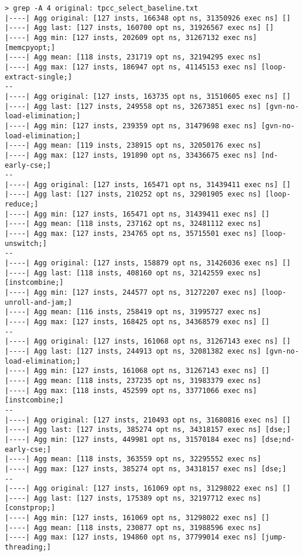 \documentclass{vldb}
\begin{document}
\begin{lstlisting}
> grep -A 4 original: tpcc_select_baseline.txt 
|----| Agg original: [127 insts, 166348 opt ns, 31350926 exec ns] []
|----| Agg last: [127 insts, 160700 opt ns, 31926567 exec ns] []
|----| Agg min: [127 insts, 202609 opt ns, 31267132 exec ns] [memcpyopt;]
|----| Agg mean: [118 insts, 231719 opt ns, 32194295 exec ns]
|----| Agg max: [127 insts, 186947 opt ns, 41145153 exec ns] [loop-extract-single;]
--
|----| Agg original: [127 insts, 163735 opt ns, 31510605 exec ns] []
|----| Agg last: [127 insts, 249558 opt ns, 32673851 exec ns] [gvn-no-load-elimination;]
|----| Agg min: [127 insts, 239359 opt ns, 31479698 exec ns] [gvn-no-load-elimination;]
|----| Agg mean: [119 insts, 238915 opt ns, 32050176 exec ns]
|----| Agg max: [127 insts, 191890 opt ns, 33436675 exec ns] [nd-early-cse;]
--
|----| Agg original: [127 insts, 165471 opt ns, 31439411 exec ns] []
|----| Agg last: [127 insts, 210252 opt ns, 32901905 exec ns] [loop-reduce;]
|----| Agg min: [127 insts, 165471 opt ns, 31439411 exec ns] []
|----| Agg mean: [118 insts, 237162 opt ns, 32481112 exec ns]
|----| Agg max: [127 insts, 234765 opt ns, 35715501 exec ns] [loop-unswitch;]
--
|----| Agg original: [127 insts, 158879 opt ns, 31426036 exec ns] []
|----| Agg last: [118 insts, 408160 opt ns, 32142559 exec ns] [instcombine;]
|----| Agg min: [127 insts, 244577 opt ns, 31272207 exec ns] [loop-unroll-and-jam;]
|----| Agg mean: [116 insts, 258419 opt ns, 31995727 exec ns]
|----| Agg max: [127 insts, 168425 opt ns, 34368579 exec ns] []
--
|----| Agg original: [127 insts, 161068 opt ns, 31267143 exec ns] []
|----| Agg last: [127 insts, 244913 opt ns, 32081382 exec ns] [gvn-no-load-elimination;]
|----| Agg min: [127 insts, 161068 opt ns, 31267143 exec ns] []
|----| Agg mean: [118 insts, 237235 opt ns, 31983379 exec ns]
|----| Agg max: [118 insts, 452599 opt ns, 33771066 exec ns] [instcombine;]
--
|----| Agg original: [127 insts, 210493 opt ns, 31680816 exec ns] []
|----| Agg last: [127 insts, 385274 opt ns, 34318157 exec ns] [dse;]
|----| Agg min: [127 insts, 449981 opt ns, 31570184 exec ns] [dse;nd-early-cse;]
|----| Agg mean: [118 insts, 363559 opt ns, 32295552 exec ns]
|----| Agg max: [127 insts, 385274 opt ns, 34318157 exec ns] [dse;]
--
|----| Agg original: [127 insts, 161069 opt ns, 31298022 exec ns] []
|----| Agg last: [127 insts, 175389 opt ns, 32197712 exec ns] [constprop;]
|----| Agg min: [127 insts, 161069 opt ns, 31298022 exec ns] []
|----| Agg mean: [118 insts, 230877 opt ns, 31988596 exec ns]
|----| Agg max: [127 insts, 194860 opt ns, 37799014 exec ns] [jump-threading;]

\end{lstlisting}
\end{document}
